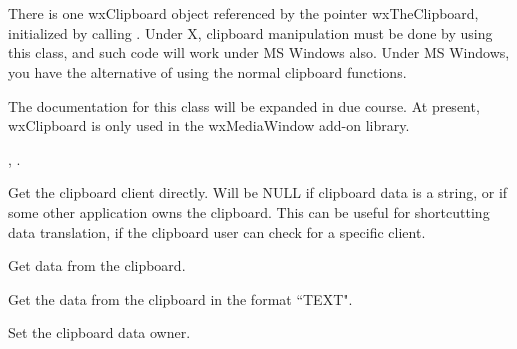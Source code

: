\section{}\label{wxclipboard}

There is one wxClipboard object referenced by the pointer
wxTheClipboard, initialized by calling .
Under X, clipboard manipulation must be done by using this class, and
such code will work under MS Windows also. Under MS Windows, you have the
alternative of using the normal clipboard functions.

The documentation for this class will be expanded in due course. At present,
wxClipboard is only used in the wxMediaWindow add-on library.




, .




Get the clipboard client directly. Will be NULL if clipboard data
is a string, or if some other application owns the clipboard. 
This can be useful for shortcutting data translation, if the
clipboard user can check for a specific client.



Get data from the clipboard.



Get the data from the clipboard in the format ``TEXT".



Set the clipboard data owner.



